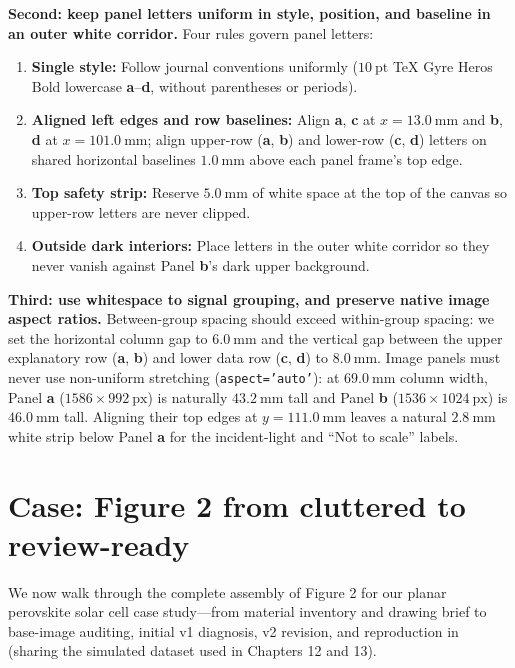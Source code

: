 \textbf{Second: keep panel letters uniform in style, position, and baseline in an outer white corridor.}
Four rules govern panel letters:
\begin{enumerate}
\item \textbf{Single style:} Follow journal conventions uniformly ($10\ \text{pt}$ TeX Gyre Heros Bold lowercase \textbf{a}--\textbf{d}, without parentheses or periods).
\item \textbf{Aligned left edges and row baselines:} Align \textbf{a}, \textbf{c} at $x = 13.0\ \text{mm}$ and \textbf{b}, \textbf{d} at $x = 101.0\ \text{mm}$; align upper-row (\textbf{a}, \textbf{b}) and lower-row (\textbf{c}, \textbf{d}) letters on shared horizontal baselines $1.0\ \text{mm}$ above each panel frame's top edge.
\item \textbf{Top safety strip:} Reserve $5.0\ \text{mm}$ of white space at the top of the canvas so upper-row letters are never clipped.
\item \textbf{Outside dark interiors:} Place letters in the outer white corridor so they never vanish against Panel \textbf{b}'s dark upper background.
\end{enumerate}

\textbf{Third: use whitespace to signal grouping, and preserve native image aspect ratios.}
Between-group spacing should exceed within-group spacing: we set the horizontal column gap to $6.0\ \text{mm}$ and the vertical gap between the upper explanatory row (\textbf{a}, \textbf{b}) and lower data row (\textbf{c}, \textbf{d}) to $8.0\ \text{mm}$. Image panels must never use non-uniform stretching (\texttt{aspect='auto'}): at $69.0\ \text{mm}$ column width, Panel \textbf{a} ($1586 \times 992\ \text{px}$) is naturally $43.2\ \text{mm}$ tall and Panel \textbf{b} ($1536 \times 1024\ \text{px}$) is $46.0\ \text{mm}$ tall. Aligning their top edges at $y = 111.0\ \text{mm}$ leaves a natural $2.8\ \text{mm}$ white strip below Panel \textbf{a} for the incident-light and ``Not to scale'' labels.

\section{Case: Figure 2 from cluttered to review-ready}

We now walk through the complete assembly of Figure 2 for our planar perovskite solar cell case study---from material inventory and drawing brief to base-image auditing, initial v1 diagnosis, v2 revision, and reproduction in \scidraw{} (sharing the simulated dataset used in Chapters 12 and 13).

